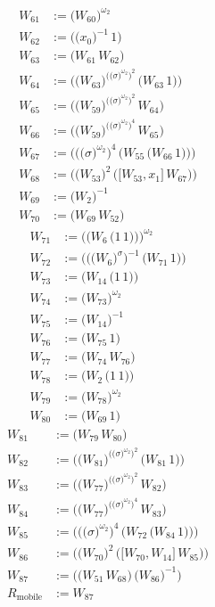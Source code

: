 \begin{align*}
W_{61} &:= \bigl(W_{60}\bigr)^{\omega_2} \\
W_{62} &:= \bigl(\bigl(x_{0}\bigr)^{-1}\,1\bigr) \\
W_{63} &:= \bigl(W_{61}\,W_{62}\bigr) \\
W_{64} &:= \bigl(\bigl(W_{63}\bigr)^{\bigl(\bigl(\sigma\bigr)^{\omega_2}\bigr)^{2}}\,\bigl(W_{63}\,1\bigr)\bigr) \\
W_{65} &:= \bigl(\bigl(W_{59}\bigr)^{\bigl(\bigl(\sigma\bigr)^{\omega_2}\bigr)^{2}}\,W_{64}\bigr) \\
W_{66} &:= \bigl(\bigl(W_{59}\bigr)^{\bigl(\bigl(\sigma\bigr)^{\omega_2}\bigr)^{4}}\,W_{65}\bigr) \\
W_{67} &:= \bigl(\bigl(\bigl(\sigma\bigr)^{\omega_2}\bigr)^{4}\,\bigl(W_{55}\,\bigl(W_{66}\,1\bigr)\bigr)\bigr) \\
W_{68} &:= \bigl(\bigl(W_{53}\bigr)^{2}\,\bigl(\bigl[W_{53},x_{1}\bigr]\,W_{67}\bigr)\bigr) \\
W_{69} &:= \bigl(W_{2}\bigr)^{-1} \\
W_{70} &:= \bigl(W_{69}\,W_{52}\bigr)
\end{align*}
\begin{align*}
W_{71} &:= \bigl(\bigl(W_{6}\,\bigl(1\,1\bigr)\bigr)\bigr)^{\omega_2} \\
W_{72} &:= \bigl(\bigl(\bigl(W_{6}\bigr)^{\sigma}\bigr)^{-1}\,\bigl(W_{71}\,1\bigr)\bigr) \\
W_{73} &:= \bigl(W_{14}\,\bigl(1\,1\bigr)\bigr) \\
W_{74} &:= \bigl(W_{73}\bigr)^{\omega_2} \\
W_{75} &:= \bigl(W_{14}\bigr)^{-1} \\
W_{76} &:= \bigl(W_{75}\,1\bigr) \\
W_{77} &:= \bigl(W_{74}\,W_{76}\bigr) \\
W_{78} &:= \bigl(W_{2}\,\bigl(1\,1\bigr)\bigr) \\
W_{79} &:= \bigl(W_{78}\bigr)^{\omega_2} \\
W_{80} &:= \bigl(W_{69}\,1\bigr)
\end{align*}
\begin{align*}
W_{81} &:= \bigl(W_{79}\,W_{80}\bigr) \\
W_{82} &:= \bigl(\bigl(W_{81}\bigr)^{\bigl(\bigl(\sigma\bigr)^{\omega_2}\bigr)^{2}}\,\bigl(W_{81}\,1\bigr)\bigr) \\
W_{83} &:= \bigl(\bigl(W_{77}\bigr)^{\bigl(\bigl(\sigma\bigr)^{\omega_2}\bigr)^{2}}\,W_{82}\bigr) \\
W_{84} &:= \bigl(\bigl(W_{77}\bigr)^{\bigl(\bigl(\sigma\bigr)^{\omega_2}\bigr)^{4}}\,W_{83}\bigr) \\
W_{85} &:= \bigl(\bigl(\bigl(\sigma\bigr)^{\omega_2}\bigr)^{4}\,\bigl(W_{72}\,\bigl(W_{84}\,1\bigr)\bigr)\bigr) \\
W_{86} &:= \bigl(\bigl(W_{70}\bigr)^{2}\,\bigl(\bigl[W_{70},W_{14}\bigr]\,W_{85}\bigr)\bigr) \\
W_{87} &:= \bigl(\bigl(W_{51}\,W_{68}\bigr)\,\bigl(W_{86}\bigr)^{-1}\bigr) \\
R_{\mathrm{mobile}} &:= W_{87}
\end{align*}

